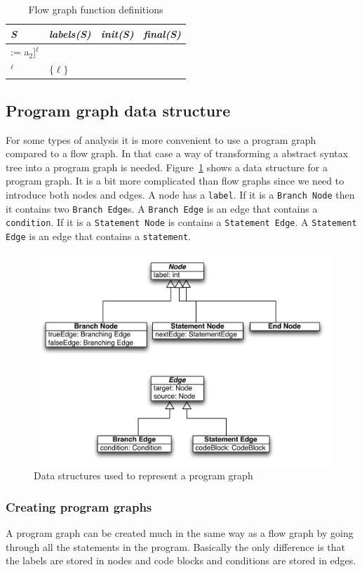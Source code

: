 \begin{table}
\begin{tabular}{| l | l | l | l |}
\hline
\textsl{S} & \textsl{labels(S)} & \textsl{init(S)} & \textsl{final(S)} \\ 
\hline
[int A[a$_1$] := a$_2$]$^\ell$ & & & \\
\hline
[read \textsl{x}]$^\ell$ & $\{\ell\}$ & & \\
\end{tabular}
\centering
\caption{Flow graph function definitions}
\end{table}

\subsection{Program graph data structure}
For some types of analysis it is more convenient to use a program graph compared to a flow graph. In that case a way of transforming a abstract syntax tree into a program graph is needed. Figure~\ref{fig:programgraph} shows a data structure for a program graph. It is a bit more complicated than flow graphs since we need to introduce both nodes and edges. A node has a \texttt{label}. If it is a \texttt{Branch Node} then it contains two \texttt{Branch Edge}s. A \texttt{Branch Edge} is an edge that contains a \texttt{condition}. If it is a \texttt{Statement Node} is contains a \texttt{Statement Edge}. A \texttt{Statement Edge} is an edge that contains a \texttt{statement}.

\begin{figure}[h]
	\centering
	\includegraphics[scale=1.0]{../img/program_graph}
	\caption{Data structures used to represent a program graph}
	\label{fig:programgraph}
\end{figure}

\subsubsection{Creating program graphs}
A program graph can be created much in the same way as a flow graph by going through all the statements in the program. Basically the only difference is that the labels are stored in nodes and code blocks and conditions are stored in edges.